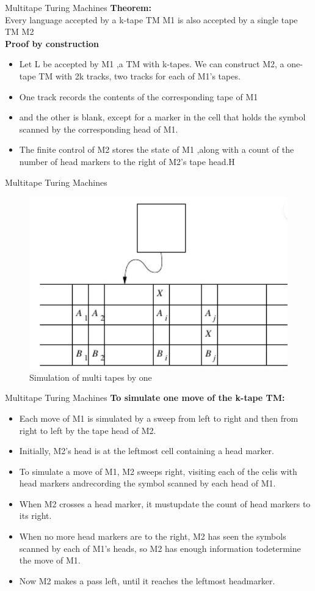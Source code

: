 \documentclass{beamer}
\begin{document}
\begin{frame}{ Multitape Turing Machines}
\textbf{Theorem:}\\ Every language accepted by a k-tape TM M1 is also accepted by a single tape TM M2\\
\textbf{Proof by construction}
	\begin{itemize}
		\item Let L be accepted by M1 ,a TM with k-tapes. We can construct M2, a one-tape TM with 2k tracks, two tracks for each of M1’s tapes.
		\item One track records the contents of the corresponding tape of M1
		\item and the other is blank, except for a marker in the cell that holds the symbol scanned by the corresponding head of M1.
		\item  The finite control of M2 stores the state of M1 ,along with a count of the number of head markers to the right of M2’s tape head.H
	\end{itemize}
\end{frame}
\begin{frame}{ Multitape Turing Machines}
	\begin{figure}
		\includegraphics[scale=.8]{img5/m18}
		\caption{Simulation of multi tapes by one}
	\end{figure}
\end{frame}
\begin{frame}{ Multitape Turing Machines}
	\textbf{To simulate one move of the k-tape TM:}
	\begin{itemize}
		\item Each move of M1 is simulated by a sweep from left to right and then from right to left by the tape head of M2.
		\item Initially, M2’s head is at the leftmost cell containing a head marker.
		\item To simulate a move of M1, M2 sweeps right, visiting each of the celis with head markers andrecording the symbol scanned by each head of M1.
		\item When M2 crosses a head marker, it mustupdate the count of head markers to its right.
		\item When no more head markers are to the right, M2 has seen the symbols scanned by each of M1’s heads, so M2 has enough information todetermine the move of M1.
		\item  Now M2 makes a pass left, until it reaches the leftmost headmarker.
	\end{itemize}
\end{frame}
\end{document}
